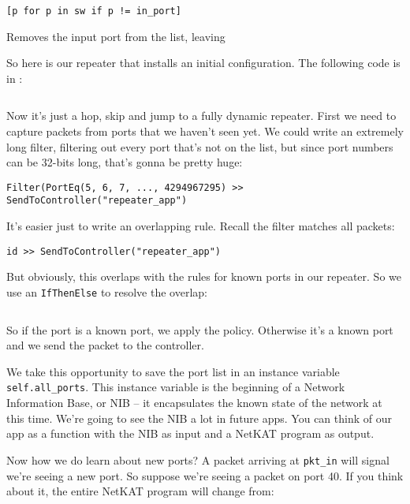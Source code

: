 \begin{verbatim}
[p for p in sw if p != in_port]
\end{verbatim}

Removes the input port from the list, leaving \python{[2,3,4]}

So here is our repeater that installs an initial configuration.
The following code is in :

\inputminted{python}{code/netkat_principles/repeater4.py}

Now it's just a hop, skip and  jump to a fully dynamic repeater.  First we need to capture packets from ports
that we haven't seen yet.  We could write an extremely long filter, filtering out every port that's not on the
list, but since port numbers can be 32-bits long, that's gonna be pretty huge:

\begin{verbatim}
Filter(PortEq(5, 6, 7, ..., 4294967295) >> SendToController("repeater_app")
\end{verbatim}

It's easier just to write an overlapping rule.  Recall the  filter matches all packets:

\begin{verbatim}
id >> SendToController("repeater_app")
\end{verbatim}

But obviously, this overlaps with the rules for known ports in our repeater.  So we use an \texttt{IfThenElse} to 
resolve the overlap:

\inputminted[firstline=14,lastline=25]{python}{code/netkat_principles/repeater5.py}

So if the port is a known port, we apply the  policy.  Otherwise it's a known port
and we send the packet to the controller.

We take this opportunity to save the port list in an instance variable \texttt{self.all\_ports}.  This instance variable
is the beginning of a Network Information Base, or NIB -- it encapsulates the known state of the network
at this time.  We're going to see the NIB a lot in future apps.  You can think of our app as a function with the
NIB as input and a NetKAT program as output.  

Now how we do learn about new ports?  A packet arriving at \texttt{pkt\_in} will signal we're seeing a new port.
So suppose we're seeing a packet on port 40.  If you think about it, the entire NetKAT program will change from:

